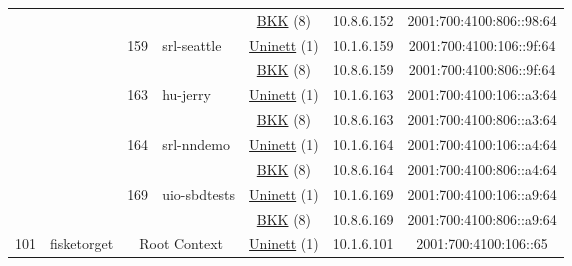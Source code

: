 \begin{small}
\begin{center}
\begin{longtable}{|c|c|c|c|c|c|c|c|}
  &  &  &  & \multicolumn{2}{|c|}{\tiny{\href{http://bkk.no}{BKK} (8)}} & \tiny{10.8.6.152} & \tiny{2001:700:4100:806::98:64} \\* \cline{3-3}\cline{4-4}\cline{5-5}\cline{6-6}\cline{7-7}\cline{8-8}
  &  & \multirow{2}{*}{\tiny{159}} & \multicolumn{1}{|l|}{\multirow{2}{*}{\tiny{srl-seattle}}} & \multicolumn{2}{|c|}{\tiny{\href{https://www.uninett.no}{Uninett} (1)}} & \tiny{10.1.6.159} & \tiny{2001:700:4100:106::9f:64} \\* \cline{5-5}\cline{6-6}\cline{7-7}\cline{8-8}
  &  &  &  & \multicolumn{2}{|c|}{\tiny{\href{http://bkk.no}{BKK} (8)}} & \tiny{10.8.6.159} & \tiny{2001:700:4100:806::9f:64} \\* \cline{3-3}\cline{4-4}\cline{5-5}\cline{6-6}\cline{7-7}\cline{8-8}
  &  & \multirow{2}{*}{\tiny{163}} & \multicolumn{1}{|l|}{\multirow{2}{*}{\tiny{hu-jerry}}} & \multicolumn{2}{|c|}{\tiny{\href{https://www.uninett.no}{Uninett} (1)}} & \tiny{10.1.6.163} & \tiny{2001:700:4100:106::a3:64} \\* \cline{5-5}\cline{6-6}\cline{7-7}\cline{8-8}
  &  &  &  & \multicolumn{2}{|c|}{\tiny{\href{http://bkk.no}{BKK} (8)}} & \tiny{10.8.6.163} & \tiny{2001:700:4100:806::a3:64} \\* \cline{3-3}\cline{4-4}\cline{5-5}\cline{6-6}\cline{7-7}\cline{8-8}
  &  & \multirow{2}{*}{\tiny{164}} & \multicolumn{1}{|l|}{\multirow{2}{*}{\tiny{srl-nndemo}}} & \multicolumn{2}{|c|}{\tiny{\href{https://www.uninett.no}{Uninett} (1)}} & \tiny{10.1.6.164} & \tiny{2001:700:4100:106::a4:64} \\* \cline{5-5}\cline{6-6}\cline{7-7}\cline{8-8}
  &  &  &  & \multicolumn{2}{|c|}{\tiny{\href{http://bkk.no}{BKK} (8)}} & \tiny{10.8.6.164} & \tiny{2001:700:4100:806::a4:64} \\* \cline{3-3}\cline{4-4}\cline{5-5}\cline{6-6}\cline{7-7}\cline{8-8}
  &  & \multirow{2}{*}{\tiny{169}} & \multicolumn{1}{|l|}{\multirow{2}{*}{\tiny{uio-sbdtests}}} & \multicolumn{2}{|c|}{\tiny{\href{https://www.uninett.no}{Uninett} (1)}} & \tiny{10.1.6.169} & \tiny{2001:700:4100:106::a9:64} \\* \cline{5-5}\cline{6-6}\cline{7-7}\cline{8-8}
  &  &  &  & \multicolumn{2}{|c|}{\tiny{\href{http://bkk.no}{BKK} (8)}} & \tiny{10.8.6.169} & \tiny{2001:700:4100:806::a9:64} \\ \hline
 \multirow{18}{*}{\tiny{101}} & \multicolumn{1}{|l|}{\multirow{18}{*}{\tiny{fisketorget}}} & \multicolumn{2}{|c|}{\multirow{2}{*}{\tiny{Root Context}}} & \multicolumn{2}{|c|}{\tiny{\href{https://www.uninett.no}{Uninett} (1)}} & \tiny{10.1.6.101} & \tiny{2001:700:4100:106::65} \\* \cline{5-5}\cline{6-6}\cline{7-7}\cline{8-8}

\end{longtable}
\end{center}
\end{small}
